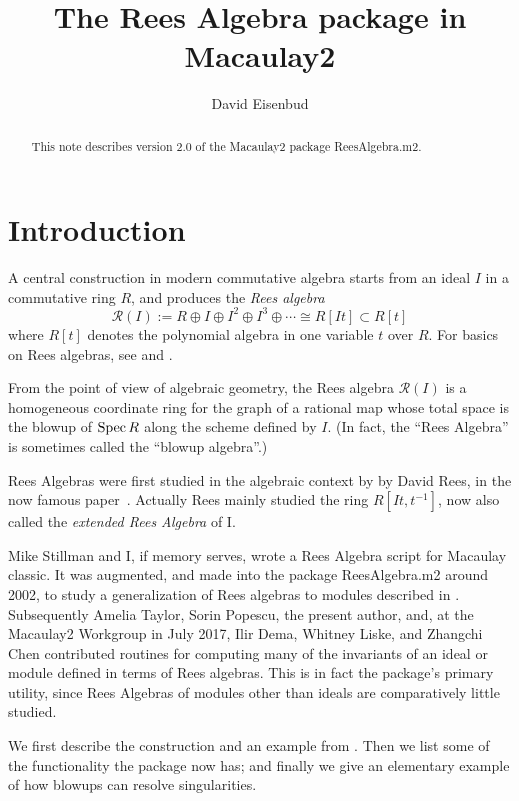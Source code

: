 \documentclass[twoside,12pt, leqno]{amsart}
\author{David Eisenbud}
\title{The Rees Algebra package in Macaulay2}
\def\RR{{\mathcal R}}
\def\Spec{{{\rm Spec}\,}}
\begin{document}
\begin{abstract}
This note describes version 2.0 of the Macaulay2 package ReesAlgebra.m2.
\end{abstract}

\maketitle

\section*{Introduction}
A central construction in modern commutative algebra starts from
an ideal $I$ in a commutative ring $R$, and produces the \emph{Rees algebra}
$$
\RR(I) :=  R\oplus I\oplus I^2\oplus I^3\oplus\cdots \cong R[It]\subset R[t]
$$ 
where $R[t]$ denotes the polynomial algebra in one variable $t$ over $R$. For basics on Rees algebras, see \cite{V} and \cite{SW}.

From the point of view of algebraic geometry, the Rees algebra $\RR(I)$ is a homogeneous
coordinate ring for the graph of a rational map whose total space is the blowup
of $\Spec R$ along the scheme defined by $I$.
 (In fact, the  ``Rees Algebra'' is sometimes called the ``blowup algebra''.)  
     

     Rees Algebras were first studied in the algebraic context by
      by David Rees, in the
     now famous paper~\cite{Rees}. Actually
     Rees mainly studied the ring 
     $R[It,t^{-1}]$, now also called the \emph{extended Rees
     Algebra} of I. 
     
Mike Stillman and I, if memory serves, wrote a Rees Algebra script for Macaulay classic. It was augmented, and made into the package ReesAlgebra.m2  around 2002,  to study a generalization of Rees algebras to modules described in \cite{EHU}. Subsequently
Amelia Taylor, 
Sorin Popescu, the present author,
and, at the Macaulay2 Workgroup in July 2017, 
Ilir Dema,
Whitney Liske, and
Zhangchi Chen
contributed routines
for computing many of the invariants of an ideal or module
defined in terms of Rees algebras. This is in fact the package's primary utility, since Rees Algebras
of modules other than ideals are comparatively little studied. 

We first describe the construction and an example from \cite{EHU}. Then we list some of the functionality the package now has; and finally we give an elementary example of how blowups can resolve singularities.
\end{document}
